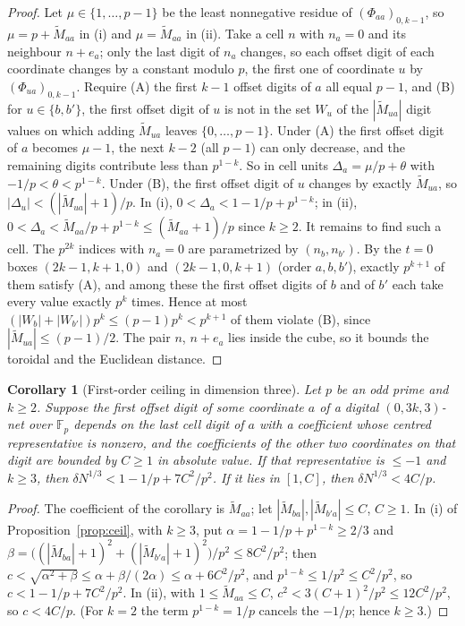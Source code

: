 \documentclass[11pt]{amsart}
\newtheorem{corollary}[theorem]{Corollary}
\theoremstyle{definition}
\theoremstyle{plain}
\newcommand{\F}{\mathbb{F}}
\begin{document}
\begin{proof}
Let $\mu\in\{1,\dots,p-1\}$ be the least nonnegative residue of $(\Phi_{aa})_{0,k-1}$, so $\mu=p+\tilde M_{aa}$ in (i) and $\mu=\tilde M_{aa}$ in (ii). Take a cell $n$ with $n_a=0$ and its neighbour $n+e_a$; only the last digit of $n_a$ changes, so each offset digit of each coordinate changes by a constant modulo $p$, the first one of coordinate $u$ by $(\Phi_{ua})_{0,k-1}$. Require
(A) the first $k-1$ offset digits of $a$ all equal $p-1$, and
(B) for $u\in\{b,b'\}$, the first offset digit of $u$ is not in the set $W_u$ of the $|\tilde M_{ua}|$ digit values on which adding $\tilde M_{ua}$ leaves $\{0,\dots,p-1\}$.
Under (A) the first offset digit of $a$ becomes $\mu-1$, the next $k-2$ (all $p-1$) can only decrease, and the remaining digits contribute less than $p^{1-k}$. So in cell units $\Delta_a=\mu/p+\theta$ with $-1/p<\theta<p^{1-k}$. Under (B), the first offset digit of $u$ changes by exactly $\tilde M_{ua}$, so $|\Delta_u|<(|\tilde M_{ua}|+1)/p$. In (i), $0<\Delta_a<1-1/p+p^{1-k}$; in (ii), $0<\Delta_a<\tilde M_{aa}/p+p^{1-k}\le(\tilde M_{aa}+1)/p$ since $k\ge2$.
It remains to find such a cell. The $p^{2k}$ indices with $n_a=0$ are parametrized by $(n_b,n_{b'})$. By the $t=0$ boxes $(2k-1,k+1,0)$ and $(2k-1,0,k+1)$ (order $a,b,b'$), exactly $p^{k+1}$ of them satisfy (A), and among these the first offset digits of $b$ and of $b'$ each take every value exactly $p^k$ times. Hence at most $(|W_b|+|W_{b'}|)p^k\le(p-1)p^k<p^{k+1}$ of them violate (B), since $|\tilde M_{ua}|\le(p-1)/2$. The pair $n$, $n+e_a$ lies inside the cube, so it bounds the toroidal and the Euclidean distance.
\end{proof}

\begin{corollary}[First-order ceiling in dimension three]\label{cor:ceil3}\label{prop:A}%
Let $p$ be an odd prime and $k\ge2$. Suppose the first offset digit of some coordinate $a$ of a digital $(0,3k,3)$-net over $\F_p$ depends on the last cell digit of $a$ with a coefficient whose centred representative is nonzero, and the coefficients of the other two coordinates on that digit are bounded by $C\ge1$ in absolute value. If that representative is $\le-1$ and $k\ge3$, then $\delta N^{1/3}<1-1/p+7C^2/p^2$. If it lies in $[1,C]$, then $\delta N^{1/3}<4C/p$.
\end{corollary}

\begin{proof}
The coefficient of the corollary is $\tilde M_{aa}$; let $|\tilde M_{ba}|,|\tilde M_{b'a}|\le C$, $C\ge1$. In (i) of Proposition~\ref{prop:ceil}, with $k\ge3$, put $\alpha=1-1/p+p^{1-k}\ge2/3$ and $\beta=\bigl((|\tilde M_{ba}|+1)^2+(|\tilde M_{b'a}|+1)^2\bigr)/p^2\le8C^2/p^2$; then $c<\sqrt{\alpha^2+\beta}\le\alpha+\beta/(2\alpha)\le\alpha+6C^2/p^2$, and $p^{1-k}\le1/p^2\le C^2/p^2$, so $c<1-1/p+7C^2/p^2$. In (ii), with $1\le\tilde M_{aa}\le C$, $c^2<3(C+1)^2/p^2\le12C^2/p^2$, so $c<4C/p$. (For $k=2$ the term $p^{1-k}=1/p$ cancels the $-1/p$; hence $k\ge3$.)
\end{proof}
\end{document}
